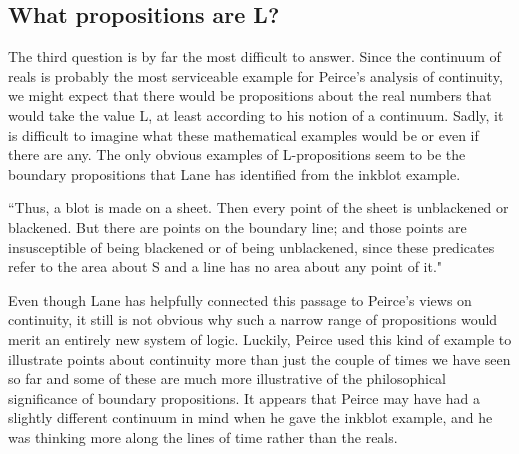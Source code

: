 \documentclass[12pt]{article}
\begin{document}
\subsection{What propositions are L?}

The third question is by far the most difficult to answer.   Since the continuum of reals is probably the most serviceable example for Peirce's analysis of continuity, we might expect that there would be propositions about the real numbers that would take the value L, at least according to his notion of a continuum. Sadly, it is difficult to imagine what these mathematical examples would be or even if there are any. The only obvious examples of L-propositions seem to be the boundary propositions that Lane has identified from the inkblot example.
\begin{singlespace}
``Thus, a blot is made on a sheet. Then every point of the sheet is unblackened or blackened. But there are points on the boundary line; and those points are insusceptible of being blackened or of being unblackened, since these predicates refer to the area about S and a line has no area about any point of it."
\end{singlespace}
\noindent Even though Lane has helpfully connected this passage to Peirce's views on continuity, it still is not obvious why such a narrow range of propositions would merit an entirely new system of logic. Luckily, Peirce used this kind of example to illustrate points about continuity more than just the couple of times we have seen so far and some of these are much more illustrative of the philosophical significance of boundary propositions. It appears that Peirce may have had a slightly different continuum in mind when he gave the inkblot example, and he was thinking more along the lines of time rather than the reals.
\end{document}
